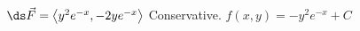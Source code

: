 {$\ds\vec{F} = \left< y^2e^{-x} , - 2ye^{-x} \right>$
}
{Conservative.  $f(x,y) = - y^{2} e^{- x} + C$}

